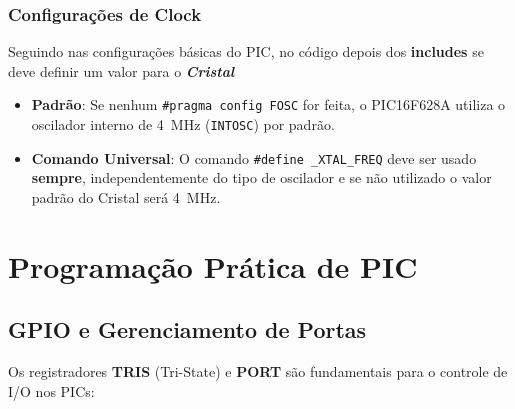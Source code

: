 \documentclass[12pt,a4paper]{book}
\begin{document}
\subsection{Configurações de Clock}
Seguindo nas configurações básicas do PIC, no código depois dos \textbf{includes} se deve definir um valor para o \textbf{\textit{Cristal}}
\begin{itemize}
\item \textbf{Padrão}: Se nenhum \texttt{\#pragma config FOSC} for feita, o PIC16F628A utiliza o oscilador interno de \qty{4}{\mega\hertz} (\texttt{INTOSC}) por padrão.
\item \textbf{Comando Universal}: O comando \texttt{\#define \_XTAL\_FREQ} deve ser usado \textbf{sempre}, independentemente do tipo de oscilador e se não utilizado o valor padrão do Cristal será \qty{4}{\mega\hertz}. 
\end{itemize}
\chapter{Programação Prática de PIC}
\section{GPIO e Gerenciamento de Portas}
Os registradores \textbf{TRIS} (Tri-State) e \textbf{PORT} são fundamentais para o controle de I/O nos PICs:
\end{document}
